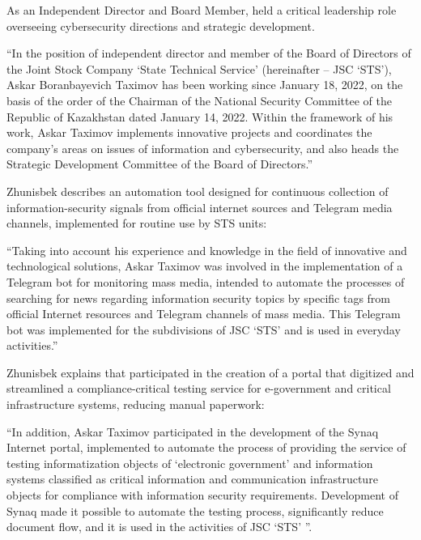 As an Independent Director and Board Member, \mrl{} held a critical leadership role overseeing cybersecurity directions and strategic development.
\begin{fullquote}
``In the position of independent director and member of the Board of Directors of the Joint Stock Company `State Technical Service' (hereinafter – JSC `STS'), Askar Boranbayevich Taximov has been working since January 18, 2022, on the basis of the order of the Chairman of the National Security Committee of the Republic of Kazakhstan dated January 14, 2022. Within the framework of his work, Askar Taximov implements innovative projects and coordinates the company’s areas on issues of information and cybersecurity, and also heads the Strategic Development Committee of the Board of Directors.''
\end{fullquote}

Zhunisbek describes an automation tool designed for continuous collection of information-security signals from official internet sources and Telegram media channels, implemented for routine use by STS units:
\begin{fullquote}
``Taking into account his experience and knowledge in the field of innovative and technological solutions, Askar Taximov was involved in the implementation of a Telegram bot for monitoring mass media, intended to automate the processes of searching for news regarding information security topics by specific tags from official Internet resources and Telegram channels of mass media. This Telegram bot was implemented for the subdivisions of JSC `STS' and is used in everyday activities.''
\end{fullquote}

Zhunisbek explains that \mrl{} participated in the creation of a portal that digitized and streamlined a compliance-critical testing service for e-government and critical infrastructure systems, reducing manual paperwork:
\begin{fullquote}
``In addition, Askar Taximov participated in the development of the Synaq Internet portal, implemented to automate the process of providing the service of testing informatization objects of `electronic government' and information systems classified as critical information and communication infrastructure objects for compliance with information security requirements. Development of Synaq made it possible to automate the testing process, significantly reduce document flow, and it is used in the activities of JSC `STS' ''.
\end{fullquote}

